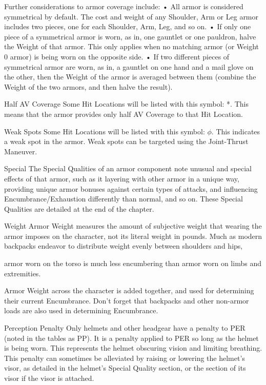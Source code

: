 \documentclass[oneside,11pt,english]{book}
\begin{document}
Further considerations to armor coverage include: 
• All armor is considered symmetrical by default. The cost and weight of any Shoulder, Arm or Leg armor 
includes two pieces, one for each Shoulder, Arm, Leg, and so on.
• If only one piece of a symmetrical armor is worn, as in, one gauntlet or one pauldron, halve the Weight of 
that armor. This only applies when no matching armor (or Weight 0 armor) is being worn on the opposite 
side.
• If two different pieces of symmetrical armor are worn, as in, a gauntlet on one hand and a mail glove on 
the other, then the Weight of the armor is averaged between them (combine the Weight of the two armors, and
then halve the result).

Half AV Coverage
Some Hit Locations will be listed with this symbol: *. This means that the armor provides only half AV Coverage to 
that Hit Location. 
	
Weak Spots
Some Hit Locations will be listed with this symbol: $\phi$. This indicates a weak spot in the armor. Weak spots can be 
targeted using the Joint-Thrust Maneuver.

Special
The Special Qualities of an armor component note unusual and special effects of that armor, such as it layering with 
other armor in a unique way, providing unique armor bonuses against certain types of attacks, and influencing 
Encumbrance/Exhaustion differently than normal, and so on. These Special Qualities are detailed at the end of the 
chapter.

Weight
Armor Weight measures the amount of subjective weight that wearing the armor imposes on the character, not its 
literal weight in pounds. Much as modern backpacks endeavor to distribute weight evenly between shoulders and hips,


armor worn on the torso is much less encumbering than armor worn on limbs and extremities.

Armor Weight across the character is added together, and used for determining their current Encumbrance. Don’t 
forget that backpacks and other non-armor loads are also used in determining Encumbrance.

Perception Penalty
Only helmets and other headgear have a penalty to PER (noted in the tables as PP). It is a penalty applied to PER so 
long as the helmet is being worn. This represents the helmet obscuring vision and limiting breathing. This penalty can 
sometimes be alleviated by raising or lowering the helmet’s visor, as detailed in the helmet’s Special Quality section, 
or the section of its visor if the visor is attached.
\end{document}
